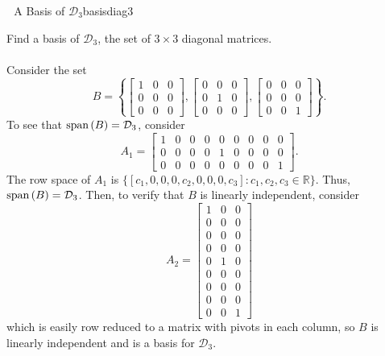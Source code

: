             \begin{example}{\Difficulty\,\Difficulty\,\Difficulty\,\,A Basis of \(\mathcal{D}_3\)}{basisdiag3}

                Find a basis of \(\mathcal{D}_3\), the set of \(3\times 3\) diagonal matrices.
                \\
                \\
                Consider the set
                \begin{equation*}
                    B=\left\{\begin{bmatrix} 1 & 0 & 0 \\ 0 & 0 & 0 \\ 0 & 0 & 0 \end{bmatrix},\begin{bmatrix} 0 & 0 & 0 \\ 0 & 1 & 0 \\ 0 & 0 & 0 \end{bmatrix},\begin{bmatrix} 0 & 0 & 0 \\ 0 & 0 & 0 \\ 0 & 0 & 1 \end{bmatrix}\right\}.
                \end{equation*}
                To see that \(\text{span\,}(B)=\mathcal{D}_3\), consider
                \begin{equation*}
                    A_1=\begin{bmatrix}
                        1 & 0 & 0 & 0 & 0 & 0 & 0 & 0 & 0 \\
                        0 & 0 & 0 & 0 & 1 & 0 & 0 & 0 & 0 \\
                        0 & 0 & 0 & 0 & 0 & 0 & 0 & 0 & 1
                    \end{bmatrix}.
                \end{equation*}
                The row space of \(A_1\) is \(\{[c_1,0,0,0,c_2,0,0,0,c_3]:c_1,c_2,c_3\in\mathbb{R}\}\). Thus, \(\text{span\,}(B)=\mathcal{D}_3\). Then, to verify that \(B\) is linearly independent, consider
                \begin{equation*}
                    A_2=\begin{bmatrix}
                        1 & 0 & 0 \\
                        0 & 0 & 0 \\
                        0 & 0 & 0 \\
                        0 & 0 & 0 \\
                        0 & 1 & 0 \\
                        0 & 0 & 0 \\
                        0 & 0 & 0 \\
                        0 & 0 & 0 \\
                        0 & 0 & 1
                    \end{bmatrix}
                \end{equation*}
                which is easily row reduced to a matrix with pivots in each column, so \(B\) is linearly independent and is a basis for \(\mathcal{D}_3\).
                
            \end{example}

